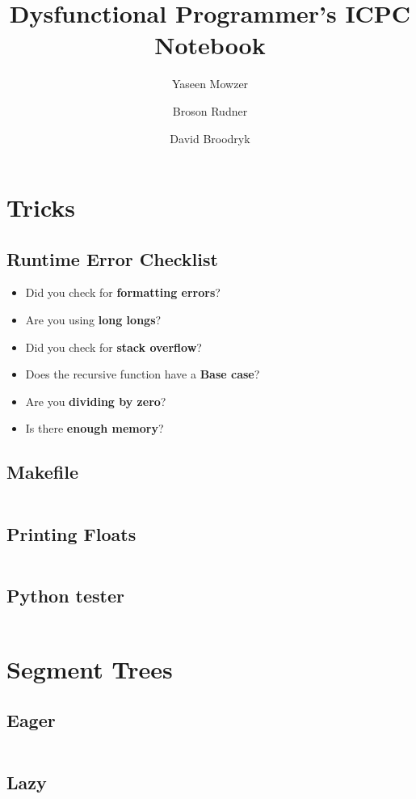 \documentclass[a4paper]{article}
\title{Dysfunctional Programmer's ICPC Notebook}
\author{Yaseen Mowzer \and Broson Rudner \and David Broodryk}
\begin{document}
\maketitle
\tableofcontents

\section{Tricks}
\subsection{Runtime Error Checklist}
\begin{itemize}
\item Did you check for \textbf{formatting errors}?
\item Are you using \textbf{long longs}?
\item Did you check for \textbf{stack overflow}?
\item Does the recursive function have a \textbf{Base case}?
\item Are you \textbf{dividing by zero}?
  \item Is there \textbf{enough memory}?
\end{itemize}
\subsection{Makefile}
\inputminted{Make}{Makefile}

\subsection{Printing Floats}
\inputminted{cpp}{abacustricks.cpp}

\subsection{Python tester}

\inputminted{py}{python-check.py}

\section{Segment Trees}
\subsection{Eager}
\inputminted{cpp}{sgt-tree.cpp}
\subsection{Lazy}
\inputminted{cpp}{lazy-sgt-tree.cpp}
\end{document}
